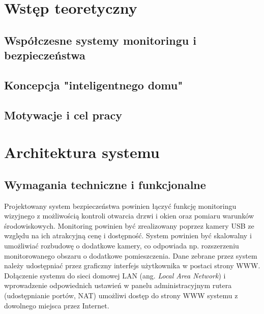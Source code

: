 \documentclass[a4paper,11pt,twoside]{article}
\begin{document}


\tableofcontents
\setcounter{tocdepth}{2}
\newpage

\section{Wstęp teoretyczny}

\subsection{Współczesne systemy monitoringu i bezpieczeństwa}

\subsection{Koncepcja "inteligentnego domu"}

\subsection{Motywacje i cel pracy}

\newpage
\section{Architektura systemu}

\subsection{Wymagania techniczne i funkcjonalne}
Projektowany system bezpieczeństwa powinien łączyć funkcję monitoringu wizyjnego z możliwością kontroli otwarcia drzwi i okien oraz pomiaru warunków środowiskowych. Monitoring powinien być zrealizowany poprzez kamery USB ze względu na ich atrakcyjną cenę i dostępność. System powinien być skalowalny i umożliwiać rozbudowę o dodatkowe kamery, co odpowiada np. rozszerzeniu monitorowanego obszaru o dodatkowe pomieszczenia. Dane zebrane przez system należy udostępniać przez graficzny interfejs użytkownika w postaci strony WWW. Dołączenie systemu do sieci domowej LAN (ang. \textit{Local Area Network}) i wprowadzenie odpowiednich ustawień w panelu administracyjnym rutera (udostępnianie portów, NAT) umożliwi dostęp do strony WWW systemu z dowolnego miejsca przez Internet.
\end{document}
